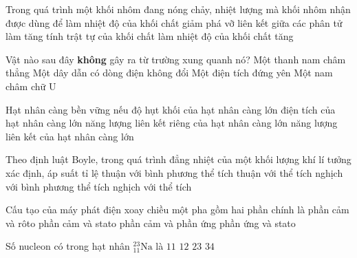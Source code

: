 	\begin{ex}%
		Trong quá trình một khối nhôm đang nóng chảy, nhiệt lượng mà khối nhôm nhận được dùng để
		\choice
		{làm nhiệt độ của khối chất giảm}
		{\True phá vỡ liên kết giữa các phân tử}
		{làm tăng tính trật tự của khối chất}
		{làm nhiệt độ của khối chất tăng}
	\end{ex}

	\begin{ex}%
		Vật nào sau đây \textbf{không} gây ra từ trường xung quanh nó?
		\choice
		{Một thanh nam châm thẳng}
		{Một dây dẫn có dòng điện không đổi}
		{\True Một điện tích đứng yên}
		{Một nam châm chữ U}
	\end{ex}

	\begin{ex}%
		Hạt nhân càng bền vững nếu
		\choice
		{độ hụt khối của hạt nhân càng lớn}
		{điện tích của hạt nhân càng lớn}
		{\True năng lượng liên kết riêng của hạt nhân càng lớn}
		{năng lượng liên kết của hạt nhân càng lớn}
	\end{ex}

	\begin{ex}%
		Theo định luật Boyle, trong quá trình đẳng nhiệt của một khối lượng khí lí tưởng xác định, áp suất tỉ lệ
		\choice
		{thuận với bình phương thể tích}
		{thuận với thể tích}
		{nghịch với bình phương thể tích}
		{\True nghịch với thể tích}
	\end{ex}

	\begin{ex}%
		Cấu tạo của máy phát điện xoay chiều một pha gồm hai phần chính là
		\choice
		{phần cảm và rôto}
		{phần cảm và stato}
		{\True phần cảm và phần ứng}
		{phần ứng và stato}
	\end{ex}

	\begin{ex}%
		Số nucleon có trong hạt nhân ${}^{23}_{11}\text{Na}$ là
		\choice
		{$11$}
		{$12$}
		{\True $23$}
		{$34$}
	\end{ex}

